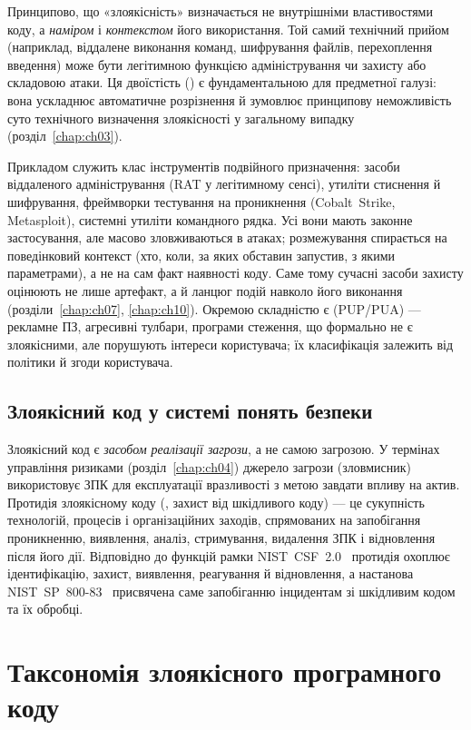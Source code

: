 Принципово, що «злоякісність» визначається не внутрішніми властивостями коду, а \emph{наміром} і \emph{контекстом} його використання. Той самий технічний прийом (наприклад, віддалене виконання команд, шифрування файлів, перехоплення введення) може бути легітимною функцією адміністрування чи захисту або складовою атаки. Ця двоїстість () є фундаментальною для предметної галузі: вона ускладнює автоматичне розрізнення й зумовлює принципову неможливість суто технічного визначення злоякісності у загальному випадку (розділ~\ref{chap:ch03}).

Прикладом служить клас інструментів подвійного призначення: засоби віддаленого адміністрування (RAT у легітимному сенсі), утиліти стиснення й шифрування, фреймворки тестування на проникнення (Cobalt~Strike, Metasploit), системні утиліти командного рядка. Усі вони мають законне застосування, але масово зловживаються в атаках; розмежування спирається на поведінковий контекст (хто, коли, за яких обставин запустив, з якими параметрами), а не на сам факт наявності коду. Саме тому сучасні засоби захисту оцінюють не лише артефакт, а й ланцюг подій навколо його виконання (розділи~\ref{chap:ch07}, \ref{chap:ch10}). Окремою складністю є  (PUP/PUA) --- рекламне ПЗ, агресивні тулбари, програми стеження, що формально не є злоякісними, але порушують інтереси користувача; їх класифікація залежить від політики й згоди користувача.

\subsection{Злоякісний код у системі понять безпеки}

Злоякісний код є \emph{засобом реалізації загрози}, а не самою загрозою. У термінах управління ризиками (розділ~\ref{chap:ch04}) джерело загрози (зловмисник) використовує ЗПК для експлуатації вразливості з метою завдати впливу на актив. Протидія злоякісному коду (, захист від шкідливого коду) --- це сукупність технологій, процесів і організаційних заходів, спрямованих на запобігання проникненню, виявлення, аналіз, стримування, видалення ЗПК і відновлення після його дії. Відповідно до функцій рамки NIST~CSF~2.0~\cite{nist-csf2} протидія охоплює ідентифікацію, захист, виявлення, реагування й відновлення, а настанова NIST~SP~800-83~\cite{nist-83} присвячена саме запобіганню інцидентам зі шкідливим кодом та їх обробці.

\section{Таксономія злоякісного програмного коду}\label{sec:ch01-taxonomy}

